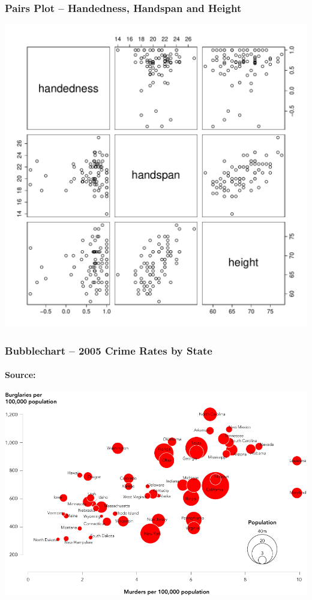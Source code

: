 \documentclass{beamer}
\begin{document}
\begin{frame}
\frametitle{Pairs Plot -- Handedness, Handspan and Height}
\begin{center}
\includegraphics[scale = 0.38]{./images/pairs}
\end{center}
\end{frame}






\begin{frame}
\frametitle{Bubblechart -- 2005 Crime Rates by State}
\framesubtitle{Source: \href{http://flowingdata.com}{}}
\centering
\includegraphics[scale = 0.30]{./images/crime_bubble2}

\end{frame}





\
\end{document}

